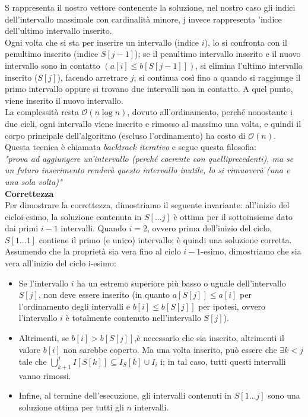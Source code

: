 \documentclass[../cheatSheetAlgoritmi.tex]{subfiles}
\begin{document}
S rappresenta il nostro vettore contenente la soluzione, nel nostro caso gli indici dell'intervallo massimale con cardinalità minore, j invece rappresenta 'indice dell'ultimo intervallo inserito. \\
Ogni volta che si sta per inserire un intervallo (indice $i$), lo si confronta con il penultimo inserito (indice $S[j -1]$); se il penultimo intervallo inserito e il nuovo intervallo sono in contatto $(a[i] \leq b[S[j -1]])$, si elimina l’ultimo intervallo inserito ($S[j]$), facendo arretrare $j$; si continua così fino a quando si raggiunge il primo intervallo oppure si trovano due intervalli non in contatto. A quel punto, viene inserito il nuovo intervallo. \\
La complessità resta $\mathcal{O}(n \log n)$, dovuto all’ordinamento, perché nonostante i due cicli, ogni intervallo viene inserito e rimosso al massimo una volta, e quindi il corpo principale dell’algoritmo (escluso l’ordinamento) ha costo di $\mathcal{O}(n)$. \\
Questa tecnica è chiamata \emph{backtrack iterativo} e segue questa filosofia: \\
\emph{"prova ad aggiungere un’intervallo (perché coerente con quelliprecedenti), ma se un futuro inserimento renderà questo intervallo inutile, lo si rimuoverà (una e una sola volta)"} \\
\textbf{Correttezza} \\
Per dimostrare la correttezza, dimostriamo il seguente invariante: all’inizio del cicloi-esimo, la soluzione contenuta in $S[...j]$ è ottima per il sottoinsieme dato dai primi $i - 1$ intervalli. Quando $i = 2$, ovvero prima dell’inizio del ciclo, $S[1...1]$ contiene il primo (e unico) intervallo; è quindi una soluzione corretta. Assumendo che la proprietà sia vera fino al ciclo $i - 1$-esimo, dimostriamo che sia vera all’inizio del ciclo i-esimo:
\begin{itemize}
	\item Se l’intervallo $i$ ha un estremo superiore più basso o uguale dell’intervallo $S[j]$, non deve essere inserito (in quanto $a[S[j]] \leq a[i]$ per l’ordinamento degli intervalli e $b[i] \leq b[S[j]]$ per ipotesi, ovvero l’intervallo $i$ è totalmente contenuto nell’intervallo $S[j]$).
	\item Altrimenti, se $b[i]> b[S[j]]$,è necessario che sia inserito, altrimenti il valore $b[i]$ non sarebbe coperto. Ma una volta inserito, può essere che $\exists k < j$ tale che $\bigcup^{j}_{k+1} I[S[k]] \subseteq I_S[k] \cup I_i$ i; in tal caso, tutti questi intervalli vanno rimossi.
	\item Infine, al termine dell’esecuzione, gli intervalli contenuti in $S[1. . . j]$ sono una soluzione ottima per tutti gli $n$ intervalli.
\end{itemize}
\end{document}

